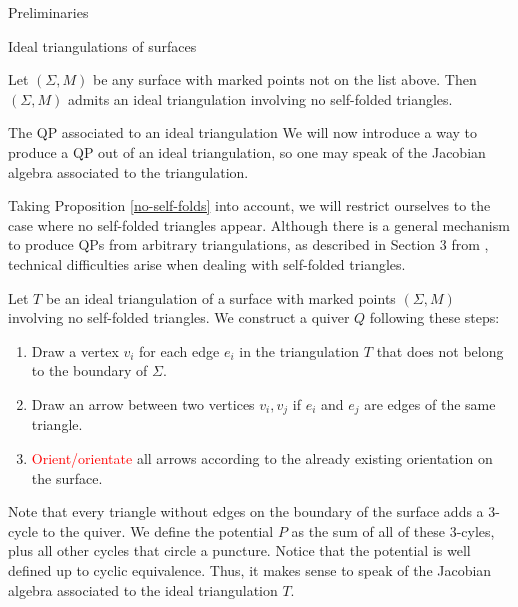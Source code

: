 \begin{chapter}{Preliminaries}
\begin{section}{Ideal triangulations of surfaces}
\begin{prop}\label{no-self-folds} Let $(\Sigma, M)$ be any surface with marked points not on the list above. Then $(\Sigma, M)$ admits an ideal triangulation involving no self-folded triangles. \hfill\qedsymbol
\end{prop}
\end{section}

\begin{section}{The QP associated to an ideal triangulation}
We will now introduce a way to produce a QP out of an ideal triangulation, so one may speak of the Jacobian algebra associated to the triangulation.

Taking Proposition \ref{no-self-folds} into account, we will restrict ourselves to the case where no self-folded triangles appear. Although there is a general mechanism to produce QPs from arbitrary triangulations, as described in Section 3 from \cite{LF09}, technical difficulties arise when dealing with self-folded triangles.

Let $T$ be an ideal triangulation of a surface with marked points $(\Sigma, M)$ involving no self-folded triangles. We construct a quiver $Q$ following these steps:
\begin{enumerate}
\item Draw a vertex $v_i$ for each edge $e_i$ in the triangulation $T$ that does not belong to the boundary of $\Sigma$.
\item Draw an arrow between two vertices $v_i, v_j$ if $e_i$ and $e_j$ are edges of the same triangle.
\item \textcolor{red}{Orient/orientate} all arrows according to the already existing orientation on the surface.
\end{enumerate}

Note that every triangle without edges on the boundary of the surface adds a 3-cycle to the quiver. We define the potential $P$ as the sum of all of these 3-cyles, plus all other cycles that circle a puncture. Notice that the potential is well defined up to cyclic equivalence. Thus, it makes sense to speak of the Jacobian algebra associated to the ideal triangulation $T$.


\end{section}
\end{chapter}
